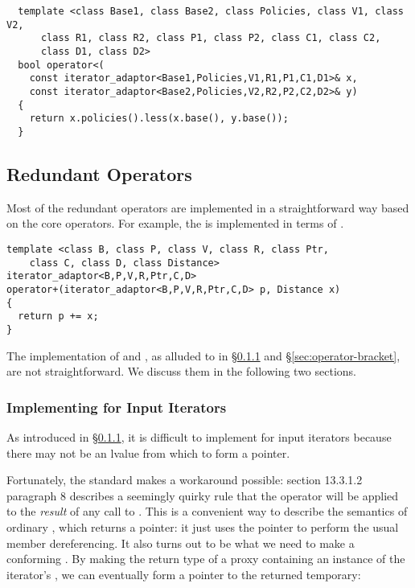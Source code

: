\documentclass{netobjectdays}
\begin{document}
{\footnotesize
\begin{verbatim}
  template <class Base1, class Base2, class Policies, class V1, class V2,
      class R1, class R2, class P1, class P2, class C1, class C2, 
      class D1, class D2>
  bool operator<(
    const iterator_adaptor<Base1,Policies,V1,R1,P1,C1,D1>& x,
    const iterator_adaptor<Base2,Policies,V2,R2,P2,C2,D2>& y)
  {
    return x.policies().less(x.base(), y.base());
  }
\end{verbatim}
}


\subsection{Redundant Operators}

Most of the redundant operators are implemented in a straightforward
way based on the core operators. For example, the  is
implemented in terms of .

{\footnotesize
\begin{verbatim}
template <class B, class P, class V, class R, class Ptr,
    class C, class D, class Distance>
iterator_adaptor<B,P,V,R,Ptr,C,D>
operator+(iterator_adaptor<B,P,V,R,Ptr,C,D> p, Distance x)
{
  return p += x;
}
\end{verbatim}
}

The implementation of  and , as
alluded to in \S\ref{sec:operator-arrow} and
\S\ref{sec:operator-bracket}, are not straightforward. We discuss them
in the following two sections.


\subsubsection{Implementing  for Input Iterators}
\label{sec:operator-arrow}

As introduced in \S\ref{sec:operator-arrow}, it is difficult to
implement  for input iterators because there may not
be an lvalue from which to form a pointer.

Fortunately, the standard makes a workaround possible: section
13.3.1.2 paragraph 8 describes a seemingly quirky rule that the
\code{->} operator will be applied to the \emph{result} of any call to
. This is a convenient way to describe the semantics
of ordinary , which returns a pointer: it just uses
the pointer to perform the usual member dereferencing. It also turns
out to be what we need to make a conforming
. By making the return type of
 a proxy containing an instance of the iterator's
, we can eventually form a  pointer to
the returned temporary:
\end{document}

